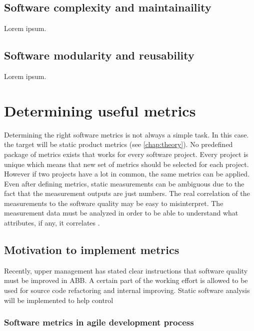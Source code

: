 \section{Software complexity and maintainaility}

Lorem ipsum.

\section{Software modularity and reusability}

Lorem ipsum.



\chapter{Determining useful metrics}

Determining the right software metrics is not always a simple task. In this case. the target will be static product metrics (see \autoref{chap:theory}). No predefined package of metrics exists that works for every software project. Every project is unique which means that new set of metrics should be selected for each project. However if two projects have a lot in common, the same metrics can be applied. Even after defining metrics, static measurements can be ambiguous due to the fact that the measurement outputs are just numbers. The real correlation of the measurements to the software quality may be easy to misinterpret. The measurement data must be analyzed in order to be able to understand what attributes, if any, it correlates \cite{sommerville2011software}. 

\section{Motivation to implement metrics}

Recently, upper management has stated clear instructions that software quality must be improved in ABB. A certain part of the working effort is allowed to be used for source code refactoring and internal improving. Static software analysis will be implemented to help control 

\subsection{Software metrics in agile development process}


